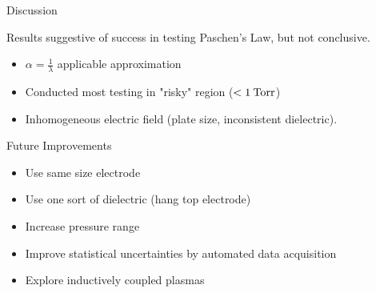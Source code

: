 \documentclass{beamer}
\begin{document}
  \begin{frame}{Discussion}
  
    Results suggestive of success in testing Paschen's Law, but not conclusive.
    
    \begin{itemize}
    \item $\alpha = \frac{1}{\lambda}$ applicable approximation
    \item Conducted most testing in "risky" region ($< 1\:\rm{Torr}$)
    \item Inhomogeneous electric field (plate size, inconsistent dielectric).
    
    \end{itemize}
   
   \end{frame}
   
  
  \begin{frame}{Future Improvements}
  \begin{itemize}
  \item Use same size electrode
  \item Use one sort of dielectric (hang top electrode)
  \item Increase pressure range
  \item Improve statistical uncertainties by automated data acquisition
  \item Explore inductively coupled plasmas
  
  \end{itemize}
  \end{frame}
\end{document}
